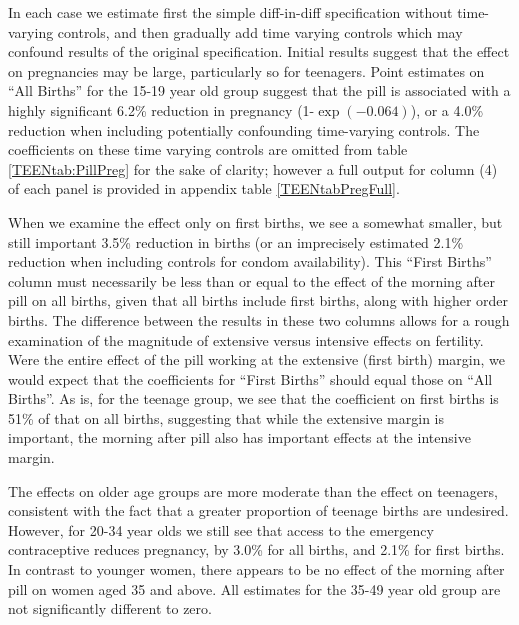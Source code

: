 In each case we estimate first the simple diff-in-diff specification without 
time-varying controls, and then gradually add time varying controls which may 
confound results of the original specification.  Initial results suggest that the 
effect on pregnancies may be large, particularly so for teenagers.  Point 
estimates on ``All Births'' for the 15-19 year old group suggest that the pill is 
associated with a highly significant 6.2\% reduction in pregnancy 
(1-$\exp(-0.064)$), or a 4.0\% reduction when including potentially confounding 
time-varying controls.  The coefficients on these time varying controls are omitted 
from table \ref{TEENtab:PillPreg} for the sake of clarity; however a full output 
for column (4) of each panel is provided in appendix table \ref{TEENtabPregFull}.

When we examine the effect only on first births, we see a somewhat smaller, but
still important 3.5\% reduction in births (or an imprecisely estimated 2.1\% 
reduction when including controls for condom availability).  This ``First Births''
column must necessarily be less than or equal to the effect of the morning after 
pill on all births, given that all births include first births, along with higher 
order births.  The difference between the results in these two columns allows
for a rough examination of the magnitude of extensive versus intensive effects
on fertility.  Were the entire effect of the pill working at the extensive 
(first birth) margin, we would expect that the coefficients for ``First Births''
should equal those on ``All Births''.  As is, for the teenage group, we see
that the coefficient on first births is 51\% of that on all births, suggesting
that while the extensive margin is important, the morning after pill also has
important effects at the intensive margin.

The effects on older age groups are more moderate than the effect on teenagers,
consistent with the fact that a greater proportion of teenage births are
undesired.  However, for 20-34 year olds we still see that access to the 
emergency contraceptive reduces pregnancy, by 3.0\% for all births, and 2.1\% for 
first births.  In contrast to younger women, there appears to be no effect of the 
morning after pill on women aged 35 and above.  All estimates for the 35-49 
year old group are not significantly different to zero.

